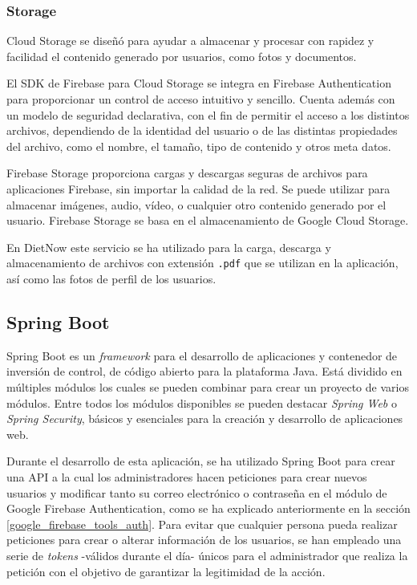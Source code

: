 \subsubsection{Storage}
Cloud Storage \cite{firebase_realtime_storage} se diseñó para ayudar a almacenar y procesar con rapidez y facilidad el contenido generado por usuarios, como fotos y documentos.

El SDK de Firebase para Cloud Storage se integra en Firebase Authentication para proporcionar un control de acceso intuitivo y sencillo. Cuenta además con un modelo de seguridad declarativa, con el fin de permitir el acceso a los distintos archivos, dependiendo de la identidad del usuario o de las distintas propiedades del archivo, como el nombre, el tamaño, tipo de contenido y otros meta datos.

Firebase Storage proporciona cargas y descargas seguras de archivos para aplicaciones Firebase, sin importar la calidad de la red. Se puede utilizar para almacenar imágenes, audio, vídeo, o cualquier otro contenido generado por el usuario. Firebase Storage se basa en el almacenamiento de Google Cloud Storage.

En DietNow este servicio se ha utilizado para la carga, descarga y almacenamiento de archivos con extensión \texttt{.pdf} que se utilizan en la aplicación, así como las fotos de perfil de los usuarios.


\subsection{Spring Boot} \label{spring_boot_tool}
Spring Boot \cite{spring_boot} es un \textit{framework} para el desarrollo de aplicaciones y contenedor de inversión de control, de código abierto para la plataforma Java. Está dividido en múltiples módulos los cuales se pueden combinar para crear un proyecto de varios módulos. Entre todos los módulos disponibles se pueden destacar \textit{Spring Web} o \textit{Spring Security}, básicos y esenciales para la creación y desarrollo de aplicaciones web.

Durante el desarrollo de esta aplicación, se ha utilizado Spring Boot para crear una API a la cual los administradores hacen peticiones para crear nuevos usuarios y modificar tanto su correo electrónico o contraseña en el módulo de Google Firebase Authentication, como se ha explicado anteriormente en la sección \ref{google_firebase_tools_auth}. Para evitar que cualquier persona pueda realizar peticiones para crear o alterar información de los usuarios, se han empleado una serie de \textit{tokens} -válidos durante el día- únicos para el administrador que realiza la petición con el objetivo de garantizar la legitimidad de la acción.

